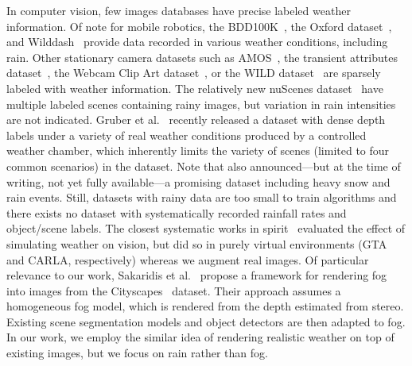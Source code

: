 In computer vision, few images databases have precise labeled weather information. 
Of note for mobile robotics, the BDD100K~\cite{yu2018bdd100k}, the Oxford dataset~\cite{RobotCarDatasetIJRR}, and Wilddash~\cite{zendel2018wilddash} provide data recorded in various weather conditions, including rain. 
Other stationary camera datasets such as AMOS~\cite{jacobs07amos}, the transient attributes dataset~\cite{Laffont14}, the Webcam Clip Art dataset~\cite{lalonde2009webcam}, or the WILD dataset~\cite{narasimhan2002all} are sparsely labeled with weather information. 
The relatively new nuScenes dataset~\cite{caesar2019nuscenes} have multiple labeled scenes containing rainy images, but variation in rain intensities are not indicated. Gruber et al.~\cite{gruber-3dv-19} recently released a dataset with dense depth labels under a variety of real weather conditions produced by a controlled weather chamber, which inherently limits the variety of scenes (limited to four common scenarios) in the dataset. Note that \cite{bijelic2019seeing} also announced---but at the time of writing, not yet fully available---a promising dataset including heavy snow and rain events.
Still, datasets with rainy data are too small to train algorithms and there exists no dataset with systematically recorded rainfall rates and object/scene labels. 
The closest systematic works in spirit~\cite{johnson2016driving,khan2019procsy} evaluated the effect of simulating weather on vision, but did so in purely virtual environments (GTA and CARLA, respectively) whereas we augment real images.
Of particular relevance to our work, Sakaridis et al.~\cite{SDV18} propose a framework for rendering fog into images from the Cityscapes~\cite{Cordts2016Cityscapes} dataset. Their approach assumes a homogeneous fog model, which is rendered from the depth estimated from stereo. Existing scene segmentation models and object detectors are then adapted to fog. 
In our work, we employ the similar idea of rendering realistic weather on top of existing images, but we focus on rain rather than fog. 
